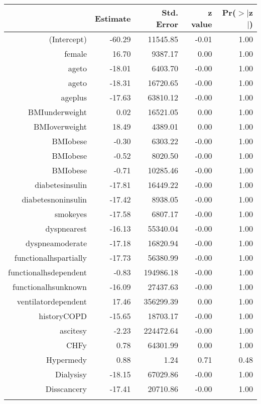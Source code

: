 \bigskip\bigskip
\centering
\begin{tabular}{rrrrr}
  \hline
 & Estimate & Std. Error & z value & Pr($>$$|$z$|$) \\ 
  \hline
(Intercept) & -60.29 & 11545.85 & -0.01 & 1.00 \\ 
  female & 16.70 & 9387.17 & 0.00 & 1.00 \\ 
  age\-65\-to\-74 & -18.01 & 6403.70 & -0.00 & 1.00 \\ 
  age\-75\-to\-84 & -18.31 & 16720.65 & -0.00 & 1.00 \\ 
  age\-85\-plus & -17.63 & 63810.12 & -0.00 & 1.00 \\ 
  BMI\-underweight & 0.02 & 16521.05 & 0.00 & 1.00 \\ 
  BMI\-overweight & 18.49 & 4389.01 & 0.00 & 1.00 \\ 
  BMI\-obese\-1 & -0.30 & 6303.22 & -0.00 & 1.00 \\ 
  BMI\-obese\-2 & -0.52 & 8020.50 & -0.00 & 1.00 \\ 
  BMI\-obese\-3 & -0.71 & 10285.46 & -0.00 & 1.00 \\ 
  diabetes\-insulin & -17.81 & 16449.22 & -0.00 & 1.00 \\ 
  diabetes\-noninsulin & -17.42 & 8938.05 & -0.00 & 1.00 \\ 
  smoke\-yes & -17.58 & 6807.17 & -0.00 & 1.00 \\ 
  dyspnea\-rest & -16.13 & 55340.04 & -0.00 & 1.00 \\ 
  dyspnea\-moderate & -17.18 & 16820.94 & -0.00 & 1.00 \\ 
  functional\-hs\-partially & -17.73 & 56380.99 & -0.00 & 1.00 \\ 
  functional\-hs\-dependent & -0.83 & 194986.18 & -0.00 & 1.00 \\ 
  functional\-hs\-unknown & -16.09 & 27437.63 & -0.00 & 1.00 \\ 
  ventilator\-dependent & 17.46 & 356299.39 & 0.00 & 1.00 \\ 
  history\-COPD & -15.65 & 18703.17 & -0.00 & 1.00 \\ 
  ascites\-y & -2.23 & 224472.64 & -0.00 & 1.00 \\ 
  CHF\-y & 0.78 & 64301.99 & 0.00 & 1.00 \\ 
  Hyper\-med\-y & 0.88 & 1.24 & 0.71 & 0.48 \\ 
  Dialysis\-y & -18.15 & 67029.86 & -0.00 & 1.00 \\ 
  Diss\-cancer\-y & -17.41 & 20710.86 & -0.00 & 1.00 \\ 
$$
\end{tabular}

